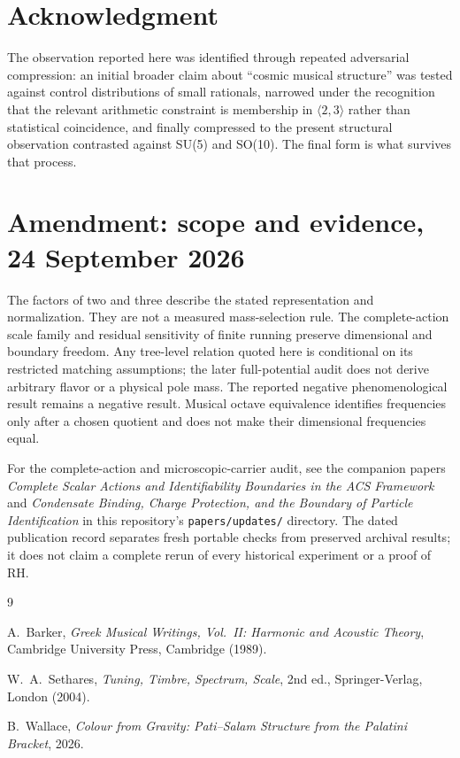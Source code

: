 \documentclass[11pt]{article}
\theoremstyle{plain}
\theoremstyle{remark}
\begin{document}
\section*{Acknowledgment}

The observation reported here was identified through repeated
adversarial compression: an initial broader claim about ``cosmic
musical structure'' was tested against control distributions of
small rationals, narrowed under the recognition that the relevant
arithmetic constraint is membership in $\langle 2, 3 \rangle$ rather
than statistical coincidence, and finally compressed to the present
structural observation contrasted against SU(5) and SO(10).  The
final form is what survives that process.


\section*{Amendment: scope and evidence, 24 September 2026}
The factors of two and three describe the stated representation and normalization. They are not a measured mass-selection rule. The complete-action scale family and residual sensitivity of finite running preserve dimensional and boundary freedom. Any tree-level relation quoted here is conditional on its restricted matching assumptions; the later full-potential audit does not derive arbitrary flavor or a physical pole mass. The reported negative phenomenological result remains a negative result. Musical octave equivalence identifies frequencies only after a chosen quotient and does not make their dimensional frequencies equal.

For the complete-action and microscopic-carrier audit, see the companion
papers \emph{Complete Scalar Actions and Identifiability Boundaries in the ACS
Framework} and \emph{Condensate Binding, Charge Protection, and the Boundary
of Particle Identification} in this repository's \texttt{papers/updates/}
directory. The dated publication record separates fresh portable checks
from preserved archival results; it does not claim a complete rerun of every
historical experiment or a proof of RH.

\begin{thebibliography}{9}

A.~Barker,
\textit{Greek Musical Writings, Vol.~II: Harmonic and Acoustic Theory},
Cambridge University Press, Cambridge (1989).

W.~A.~Sethares,
\textit{Tuning, Timbre, Spectrum, Scale}, 2nd ed.,
Springer-Verlag, London (2004).

B.~Wallace,
\textit{Colour from Gravity: Pati--Salam Structure from the Palatini
Bracket},
2026.

\end{thebibliography}
\end{document}
